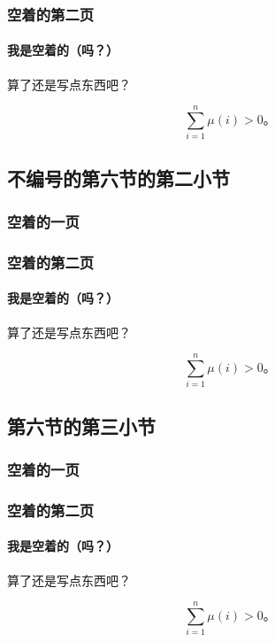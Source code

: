 \documentclass{../pkslide}
\begin{document}
\begin{frame}
  \frametitle{空着的第二页}
  \framesubtitle{我是空着的（吗？）}
  
  算了还是写点东西吧？
  
  \[ \sum_{i = 1}^{n} \mu(i) > 0 \text{。} \]
\end{frame}

\subsection*{不编号的第六节的第二小节}

\begin{frame}
  \frametitle{空着的一页}
\end{frame}

\begin{frame}
  \frametitle{空着的第二页}
  \framesubtitle{我是空着的（吗？）}
  
  算了还是写点东西吧？
  
  \[ \sum_{i = 1}^{n} \mu(i) > 0 \text{。} \]
\end{frame}

\subsection{第六节的第三小节}

\begin{frame}
  \frametitle{空着的一页}
\end{frame}

\begin{frame}
  \frametitle{空着的第二页}
  \framesubtitle{我是空着的（吗？）}
  
  算了还是写点东西吧？
  
  \[ \sum_{i = 1}^{n} \mu(i) > 0 \text{。} \]
\end{frame}
\end{document}
